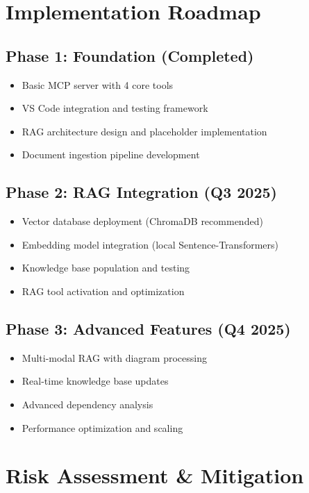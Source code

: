 \documentclass[11pt,letterpaper]{article}
\begin{document}
\section{Implementation Roadmap}

\subsection{Phase 1: Foundation (Completed)}
\begin{itemize}[leftmargin=20pt]
    \item[\color{noaaBlue}$\checkmark$] Basic MCP server with 4 core tools
    \item[\color{noaaBlue}$\checkmark$] VS Code integration and testing framework
    \item[\color{noaaBlue}$\checkmark$] RAG architecture design and placeholder implementation
    \item[\color{noaaBlue}$\checkmark$] Document ingestion pipeline development
\end{itemize}

\subsection{Phase 2: RAG Integration (Q3 2025)}
\begin{itemize}[leftmargin=20pt]
    \item Vector database deployment (ChromaDB recommended)
    \item Embedding model integration (local Sentence-Transformers)
    \item Knowledge base population and testing
    \item RAG tool activation and optimization
\end{itemize}

\subsection{Phase 3: Advanced Features (Q4 2025)}
\begin{itemize}[leftmargin=20pt]
    \item Multi-modal RAG with diagram processing
    \item Real-time knowledge base updates
    \item Advanced dependency analysis
    \item Performance optimization and scaling
\end{itemize}

\section{Risk Assessment \& Mitigation}
\end{document}
